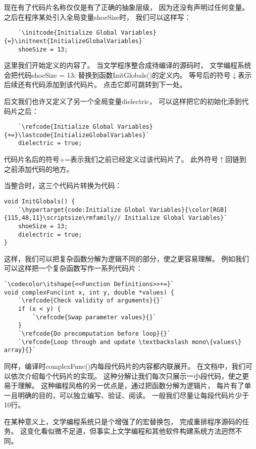 现在有了代码片名称仅仅是有了正确的抽象层级，
因为还没有声明过任何变量。
之后在程序某处引入全局变量{\ttfamily shoeSize}时，
我们可以这样写：
\begin{lstlisting}
    `\initcode{Initialize Global Variables}{=}\initnext{InitializeGlobalVariables}`
    shoeSize = 13;
\end{lstlisting}

这里我们开始定义的内容了。
当文学程序整合成待编译的源码时，
文学编程系统会把代码{\ttfamily shoeSize = 13;}
替换到函数{\ttfamily InitGlobals()}的定义内。
等号后的符号{\codecolor $\downarrow$}表示后续还有代码添加到该代码片。
点击它即可跳转到下一处。

后文我们也许又定义了另一个全局变量{\ttfamily dielectric}，
可以这样把它的初始化添到代码片之后：
\begin{lstlisting}
    `\refcode{Initialize Global Variables}{+=}\lastcode{InitializeGlobalVariables}`
    dielectric = true;
\end{lstlisting}

代码片名后的符号{\codecolor +=}表示我们之前已经定义过该代码片了。
此外符号{\codecolor $\uparrow$}回链到
之前添加代码的地方。

当整合时，这三个代码片转换为代码：
\begin{lstlisting}
void InitGlobals() {
    `\hypertarget{code:Initialize Global Variables}{\color[RGB]{115,48,11}\scriptsize\rmfamily// Initialize Global Variables}`
    shoeSize = 13;
    dielectric = true;
}
\end{lstlisting}

这样，我们可以把复杂函数分解为逻辑不同的部分，使之更容易理解。
例如我们可以这样把一个复杂函数写作一系列代码片：
\begin{lstlisting}
`\codecolor\itshape{<<Function Definitions>>+=}`
void complexFunc(int x, int y, double *values) {
    `\refcode{Check validity of arguments}{}`
    if (x < y) {
        `\refcode{Swap parameter values}{}`
    }
    `\refcode{Do precomputation before loop}{}`
    `\refcode{Loop through and update \textbackslash mono\{values\} array}{}`
\end{lstlisting}

同样，编译时{\ttfamily complexFunc()}内每段代码片的内容都内联展开。
在文档中，我们可以依次介绍每个代码片的实现。
这种分解让我们每次只展示一小段代码，使之更易于理解。
这种编程风格的另一优点是，通过把函数分解为逻辑片，
每片有了单一且明确的目的，可以独立编写、验证、阅读。
一般我们尽量让每段代码片少于10行。

在某种意义上，文学编程系统只是个增强了的宏替换包，
完成重排程序源码的任务。
这变化看似微不足道，但事实上文学编程和其他软件构建系统方法迥然不同。

